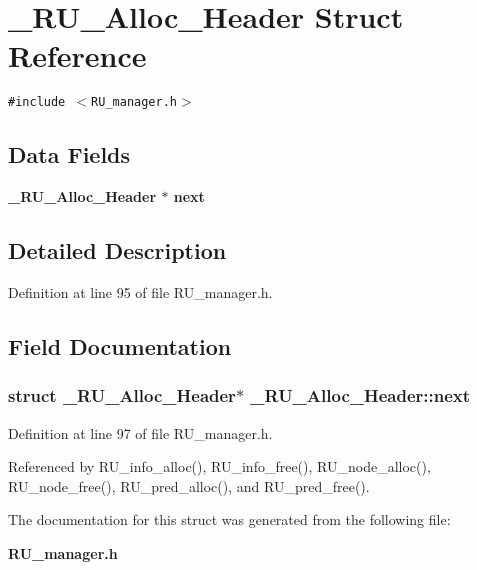 \section{\_\-RU\_\-Alloc\_\-Header Struct Reference}
\label{struct__RU__Alloc__Header}
{\tt \#include $<$RU\_\-manager.h$>$}

\subsection*{Data Fields}
\begin{CompactItemize}
\item 
\bf{\_\-RU\_\-Alloc\_\-Header} $\ast$ \bf{next}
\end{CompactItemize}


\subsection{Detailed Description}




Definition at line 95 of file RU\_\-manager.h.

\subsection{Field Documentation}
\subsubsection{\setlength{\rightskip}{0pt plus 5cm}struct \bf{\_\-RU\_\-Alloc\_\-Header}$\ast$ \bf{\_\-RU\_\-Alloc\_\-Header::next}}\label{struct__RU__Alloc__Header_b434a041f64b181649c1db5dcd3fa490}




Definition at line 97 of file RU\_\-manager.h.

Referenced by RU\_\-info\_\-alloc(), RU\_\-info\_\-free(), RU\_\-node\_\-alloc(), RU\_\-node\_\-free(), RU\_\-pred\_\-alloc(), and RU\_\-pred\_\-free().

The documentation for this struct was generated from the following file:\begin{CompactItemize}
\item 
\bf{RU\_\-manager.h}\end{CompactItemize}
